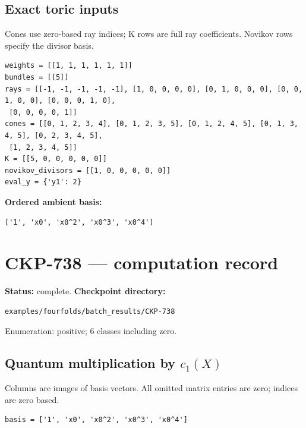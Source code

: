 \documentclass[10pt,a4paper]{article}
\begin{document}
\subsection*{Exact toric inputs}
Cones use zero-based ray indices; K rows are full ray coefficients. Novikov rows specify the divisor basis.

\begin{lstlisting}
weights = [[1, 1, 1, 1, 1, 1]]
bundles = [[5]]
rays = [[-1, -1, -1, -1, -1], [1, 0, 0, 0, 0], [0, 1, 0, 0, 0], [0, 0, 1, 0, 0], [0, 0, 0, 1, 0],
 [0, 0, 0, 0, 1]]
cones = [[0, 1, 2, 3, 4], [0, 1, 2, 3, 5], [0, 1, 2, 4, 5], [0, 1, 3, 4, 5], [0, 2, 3, 4, 5],
 [1, 2, 3, 4, 5]]
K = [[5, 0, 0, 0, 0, 0]]
novikov_divisors = [[1, 0, 0, 0, 0, 0]]
eval_y = {'y1': 2}
\end{lstlisting}

\textbf{Ordered ambient basis:}
\begin{lstlisting}
['1', 'x0', 'x0^2', 'x0^3', 'x0^4']
\end{lstlisting}

\clearpage\section*{CKP-738 --- computation record}
\textbf{Status:} complete.
\textbf{Checkpoint directory:}
\begin{lstlisting}
examples/fourfolds/batch_results/CKP-738
\end{lstlisting}

Enumeration: positive; 6 classes including zero.
\subsection*{Quantum multiplication by $c_1(X)$}
Columns are images of basis vectors. All omitted matrix entries are zero; indices are zero based.

\begin{lstlisting}
basis = ['1', 'x0', 'x0^2', 'x0^3', 'x0^4']
\end{lstlisting}
\end{document}
